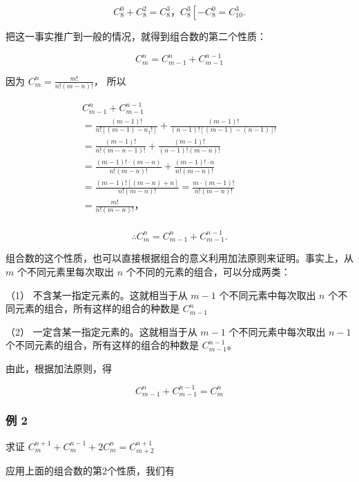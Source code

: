 \[
C _ {8} ^ {0} + C _ {8} ^ {2} = C _ {8} ^ {3}\text{，} C _ {8} ^ {3} \left[ - C _ {8} ^ {0} = C _ {10} ^ {3}. \right.
\]

把这一事实推广到一般的情况，就得到组合数的第二个性质：

\[
\boxed{C_m^n=C_{m-1}^n+C_{m-1}^{n-1}}
\]

 因为 \(C_m^n = \frac{m!}{n!(m - n)!}\)， 所以

\[
\begin{array}{l} C _ {m - 1} ^ {n} + C _ {m - 1} ^ {n - 1} \\ = \frac {(m - 1) !}{n ! [ (m - 1) - n _ {1} ! ]} + \frac {(m - 1) !}{(n - 1) ! [ (m - 1) - (n - 1) ] !} \\ = \frac {(m - 1) !}{n ! (m - n - 1) !} + \frac {(m - 1) !}{(n - 1) ! (m - n) !} \\ = \frac {(m - 1) ! \cdot (m - n)}{n ! (m - n) !} + \frac {(m - 1) ! \cdot n}{n ! (m - n) !} \\ = \frac {(m - 1) ! [ (m - n) + n ]}{n ! (m - n) !} = \frac {m \cdot (m - 1) !}{n ! (m - n) !} \\ = \frac {m !}{n ! (m - n) !}\text{，} \\ \end{array}
\]

\[
\therefore C _ {m} ^ {n} = C _ {m - 1} ^ {n} + C _ {m - 1} ^ {n - 1}.
\]


组合数的这个性质，也可以直接根据组合的意义利用加法原则来证明。事实上，从
\(m\) 个不同元素里每次取出 \(n\) 个不同的元素的组合，可以分成两类：

（1） 不含某一指定元素的。这就相当于从 \(m - 1\) 个不同元素中每次取出
\(n\) 个不同元素的组合，所有这样的组合的种数是 \(C_{m - 1}^{n}\)

（2） 一定含某一指定元素的。这就相当于从 \(m - 1\) 个不同元素中每次取出
\(n - 1\) 个不同元素的组合，所有这样的组合的种数是
\(C_{m - 1}^{n - 1}\)。

由此，根据加法原则，得

\[
C _ {m - 1} ^ {n} + C _ {m - 1} ^ {n - 1} = C _ {m} ^ {n}
\]

\subsubsection{例 2}

求证 \(C_{m}^{n + 1} + C_{m}^{n - 1} + 2C_{m}^{n} = C_{m + 2}^{n + 1}\)

 应用上面的组合数的第2个性质，我们有

